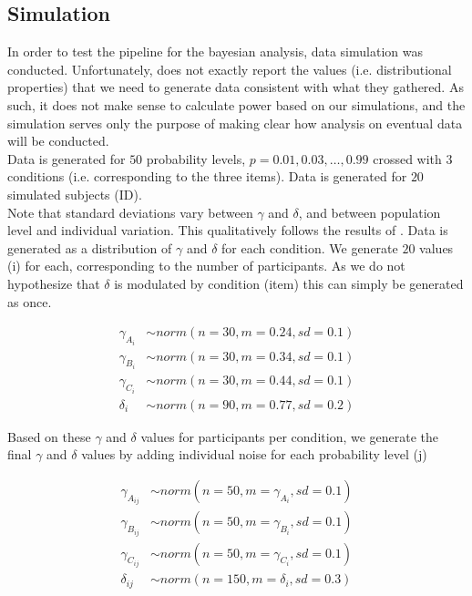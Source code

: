 \documentclass[12pt]{article}
\begin{document}
\subsection{Simulation}
In order to test the pipeline for the
bayesian analysis, data simulation was
conducted. Unfortunately, \textcite{gonzalez1999shape}
does not exactly report the values (i.e.
distributional properties) that we need
to generate data consistent with what they
gathered. As such, it does not make sense
to calculate power based on our simulations,
and the simulation serves only the purpose
of making clear how analysis on eventual data
will be conducted. \\

Data is generated for $50$ probability levels,
$p = 0.01, 0.03,  \ldots, 0.99$ crossed with $3$
conditions (i.e. corresponding to the three items).
Data is generated for $20$ simulated subjects (ID). \\

Note that standard deviations vary
between $\gamma$ and $\delta$, and
between population level and individual
variation. This qualitatively
follows the results of \textcite{gonzalez1999shape}.
Data is generated as a distribution of $\gamma$
and $\delta$ for each condition. We generate
$20$ values (i) for each, corresponding to the
number of participants. As we do not hypothesize
that $\delta$ is modulated by condition (item)
this can simply be generated as once.


\begin{equation} \label{eq1}
\begin{split}
	\gamma_{A_{i}} &\sim norm(n = 30,
	m = 0.24, sd = 0.1) \\
	\gamma_{B_{i}} &\sim norm(n = 30,
	m = 0.34, sd = 0.1) \\
	\gamma_{C_{i}} &\sim norm(n = 30,
	m = 0.44, sd = 0.1) \\
	\delta_i &\sim norm(n = 90,
	m = 0.77, sd = 0.2)
\end{split}
\end{equation}

Based on these $\gamma$ and $\delta$ values for
participants per condition, we generate
the final $\gamma$ and $\delta$ values by
adding individual noise for each probability
level (j)

\begin{equation} \label{eq2}
\begin{split}
	\gamma_{A_{ij}} &\sim norm(n = 50,
	m = \gamma_{A_{i}}, sd = 0.1) \\
	\gamma_{B_{ij}} &\sim norm(n = 50,
	m = \gamma_{B_{i}}, sd = 0.1) \\
	\gamma_{C_{ij}} &\sim norm(n = 50,
	m = \gamma_{C_{i}}, sd = 0.1) \\
	\delta_{ij} &\sim norm(n = 150,
	m = \delta_{i}, sd = 0.3)
\end{split}
\end{equation}
\end{document}
